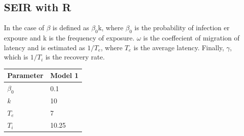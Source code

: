\documentclass{article}\usepackage[]{graphicx}\usepackage[]{color}
\begin{document}
\subsection{SEIR with R}


In the case of $\beta$ is defined as $\beta_0$k, where $\beta_0$ is the probability of infection er expoure and k is the frequency of exposure. $\omega$ is the coeffecient of migration of latency and is estimated as $1/T_e$, where $T_e$ is the average latency. Finally, $\gamma$, which is $1/T_i$ is the recovery rate.

\begin{table}
\begin{tabular}{ll}\hline
Parameter     &  Model 1 \\  \hline\hline
$\beta_0$     & 0.1     \\
$k$           & 10      \\
$T_e$         & 7       \\
$T_i$         & 10.25 \\
\hline
\end{tabular}
\end{table}
\end{document}
